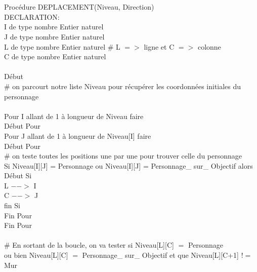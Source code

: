 \documentclass{article}
\begin{document}
\\ \begin{tabbing}
\\Procédure DEPLACEMENT(Niveau, Direction)
\\DECLARATION:
\\ I de type nombre Entier naturel
\\ J de type nombre Entier naturel
\\ L de type nombre Entier naturel		             \# L $=>$ ligne et C $=>$ colonne
\\ C de type nombre Entier naturel
\\
\\Début\\
\hspace{1cm}    \# on parcourt notre liste Niveau pour récupérer les coordonnées initiales du personnage
\\
\\ \hspace{1cm}	Pour I allant de 1 à longueur de Niveau faire
\\ \hspace{1cm} Début Pour
\\ \hspace{2cm}		Pour J allant de 1 à longueur de Niveau[I] faire
\\ \hspace{2cm}	Début Pour
\\	\hspace{3cm}		\# on teste toutes les positions une par une pour trouver celle du personnage
\\	\hspace{3cm}		Si Niveau[I][J] = Personnage ou Niveau[I][J] = Personnage\_ sur\_ Objectif alors
\\	\hspace{3cm}		Début Si
\\	\hspace{4cm}			L $-->$ I
\\	\hspace{4cm}		C $-->$ J	
\\	\hspace{3cm}	 fin Si
\\	\hspace{2cm}	Fin Pour 
\\	\hspace{1cm}   Fin Pour 
\\
\\ \# En sortant de la boucle, on va tester si Niveau[L][C] $=$ Personnage                               \\ ou bien Niveau[L][C] $=$ Personnage\_ sur\_ Objectif et que Niveau[L][C+1] $!=$ Mur

\end{tabbing}
\end{document}
